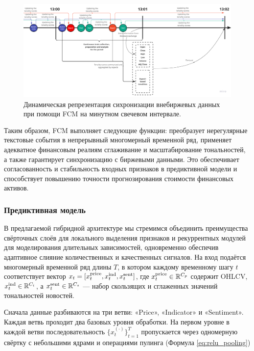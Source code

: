 \begin{figure}[H]
    \centering
    \includegraphics[width=1\linewidth]{img/feature_caching_mechanism.png}
    \caption{Динамическая репрезентация сихронизации внебиржевых данных при помощи FCM на минутном свечевом интервале.}
    \label{fig:feature_caching_mechanism}
\end{figure}

Таким образом, FCM выполняет следующие функции: преобразует нерегулярные текстовые
события в непрерывный многомерный временной ряд, применяет адекватное финансовым реалиям сглаживание и масштабирование
тональностей, а также гарантирует синхронизацию с биржевыми данными. Это обеспечивает согласованность и стабильность
входных признаков в предиктивной модели и способствует повышению точности прогнозирования стоимости финансовых активов.

\subsubsection{Предиктивная модель}
В предлагаемой гибридной архитектуре мы стремимся объединить преимущества свёрточных слоёв для локального
выделения признаков и рекуррентных модулей для моделирования длительных зависимостей, одновременно
обеспечив адаптивное слияние количественных и качественных сигналов. На вход подаётся многомерный
временной ряд длины $T$, в котором каждому временному шагу $t$ соответствует вектор
$x_t = [x_t^{\rm price}, x_t^{\rm ind}, x_t^{\rm sent}]$, где $x_t^{\rm price}\in\mathbb{R}^{C_p}$
содержит OHLCV, $x_t^{\rm ind}\in\mathbb{R}^{C_i}$, а $x_t^{\rm sent}\in\mathbb{R}^{C_s}$ ---
набор скользящих и сглаженных значений тональностей новостей.

Сначала данные разбиваются на три ветви: «Price», «Indicator» и «Sentiment». Каждая ветвь проходит два
базовых уровня обработки. На первом уровне в каждой ветви последовательность $\{x_t^{(\cdot)}\}_{t=1}^T$
пропускается через одномерную свёртку с небольшими ядрами и операциями пулинга (Формула \ref{eq:relu_pooling})

